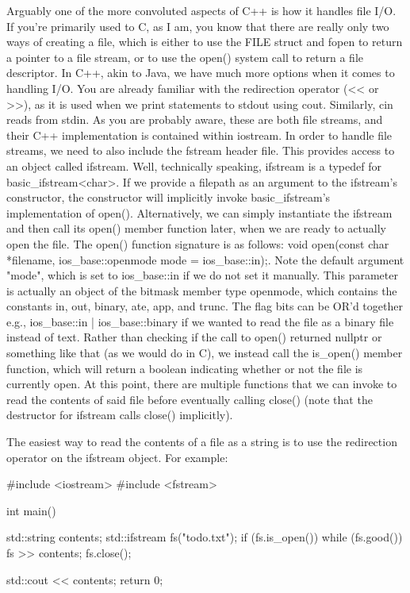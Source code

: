\documentclass{article}
\begin{document}
Arguably one of the more convoluted aspects of C++ is how it handles file I/O. If you’re primarily used to C,
as I am, you know that there are really only two ways of creating a file, which is either to use the FILE
struct and fopen to return a pointer to a file stream, or to use the open() system call to return a file
descriptor. In C++, akin to Java, we have much more options when it comes to handling I/O. You are already
familiar with the redirection operator (<< or >>), as it is used when we print statements to stdout using
cout. Similarly, cin reads from stdin. As you are probably aware, these are both file streams, and their C++
implementation is contained within iostream. In order to handle file streams, we need to also include the
fstream header file. This provides access to an object called ifstream. Well, technically speaking, ifstream
is a typedef for basic\_ifstream<char>. If we provide a filepath as an argument to the ifstream’s
constructor, the constructor will implicitly invoke basic\_ifstream’s implementation of open(). Alternatively,
we can simply instantiate the ifstream and then call its open() member function later, when we are ready to
actually open the file. The open() function signature is as follows: void open(const char *filename,
ios\_base::openmode mode = ios\_base::in);. Note the default argument "mode", which is set to ios\_base::in
if we do not set it manually. This parameter is actually an object of the bitmask member type openmode, which
contains the constants in, out, binary, ate, app, and trunc. The flag bits can be OR’d together e.g.,
ios\_base::in | ios\_base::binary if we wanted to read the file as a binary file instead of text. Rather than
checking if the call to open() returned nullptr or something like that (as we would do in C), we instead call
the is\_open() member function, which will return a boolean indicating whether or not the file is currently
open. At this point, there are multiple functions that we can invoke to read the contents of said file before
eventually calling close() (note that the destructor for ifstream calls close() implicitly).

The easiest way to read the contents of a file as a string is to use the redirection operator on the ifstream
object. For example:

\begin{cpplst}

#include <iostream>
#include <fstream>

int main()
{
    std::string contents;
    std::ifstream fs("todo.txt");
    if (fs.is_open())
    {
        while (fs.good())
        {
            fs >> contents;
        }
    }
    fs.close();

    std::cout << contents;
    return 0;
}

\end{cpplst}
\end{document}
